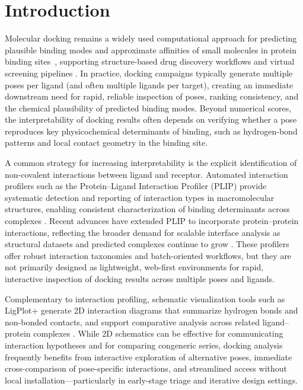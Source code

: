 \documentclass[lettersize,journal]{IEEEtran}
\begin{document}
\section{Introduction}
Molecular docking remains a widely used computational approach for predicting plausible binding modes and approximate affinities of small molecules in protein binding sites~\cite{paggi2024art}, supporting structure-based drug discovery workflows and virtual screening pipelines \cite{trott2010autodockvina}. In practice, docking campaigns typically generate multiple poses per ligand (and often multiple ligands per target), creating an immediate downstream need for rapid, reliable inspection of poses, ranking consistency, and the chemical plausibility of predicted binding modes. Beyond numerical scores, the interpretability of docking results often depends on verifying whether a pose reproduces key physicochemical determinants of binding, such as hydrogen-bond patterns and local contact geometry in the binding site.

A common strategy for increasing interpretability is the explicit identification of non-covalent interactions between ligand and receptor. Automated interaction profilers such as the Protein--Ligand Interaction Profiler (PLIP) provide systematic detection and reporting of interaction types in macromolecular structures, enabling consistent characterization of binding determinants across complexes \cite{salentin2015plip}. Recent advances have extended PLIP to incorporate protein--protein interactions, reflecting the broader demand for scalable interface analysis as structural datasets and predicted complexes continue to grow \cite{schake2025plip}. These profilers offer robust interaction taxonomies and batch-oriented workflows, but they are not primarily designed as lightweight, web-first environments for rapid, interactive inspection of docking results across multiple poses and ligands.

Complementary to interaction profiling, schematic visualization tools such as LigPlot+ generate 2D interaction diagrams that summarize hydrogen bonds and non-bonded contacts, and support comparative analysis across related ligand--protein complexes \cite{laskowski2011ligplot+}. While 2D schematics can be effective for communicating interaction hypotheses and for comparing congeneric series, docking analysis frequently benefits from interactive exploration of alternative poses, immediate cross-comparison of pose-specific interactions, and streamlined access without local installation---particularly in early-stage triage and iterative design settings.
\end{document}
